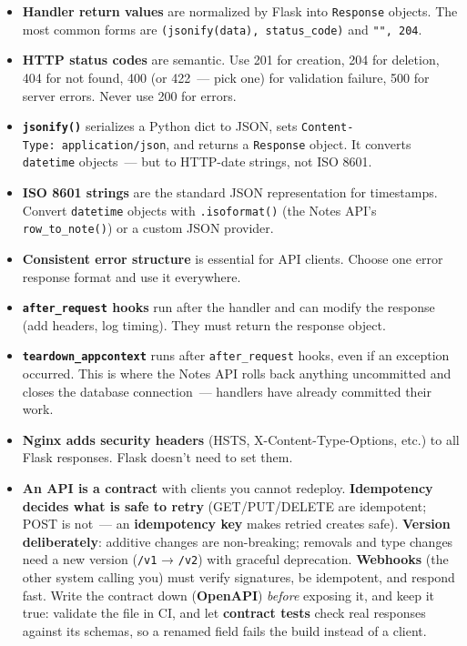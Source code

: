 \label{34-response-handling:key-takeaways}
\begin{takeaways}

\begin{itemize}
\tightlist
\item
  \textbf{Handler return values} are normalized by Flask into \texttt{Response} objects. The most common forms are \texttt{(jsonify(data),}\allowbreak{}\texttt{\ status\_}\allowbreak{}\texttt{code)} and \texttt{"",\ 204}.
\item
  \textbf{HTTP status codes} are semantic. Use 201 for creation, 204 for deletion, 404 for not found, 400 (or 422~--- pick one) for validation failure, 500 for server errors. Never use 200 for errors.
\item
  \textbf{\texttt{jsonify()}} serializes a Python dict to JSON, sets \texttt{Content-}\allowbreak{}\texttt{Type:}\allowbreak{}\texttt{\ application/}\allowbreak{}\texttt{json}, and returns a \texttt{Response} object. It converts \texttt{datetime} objects~--- but to HTTP-date strings, not ISO 8601.
\item
  \textbf{ISO 8601 strings} are the standard JSON representation for timestamps. Convert \texttt{datetime} objects with \texttt{.isoformat()} (the Notes API's \texttt{row\_to\_note()}) or a custom JSON provider.
\item
  \textbf{Consistent error structure} is essential for API clients. Choose one error response format and use it everywhere.
\item
  \textbf{\texttt{after\_request} hooks} run after the handler and can modify the response (add headers, log timing). They must return the response object.
\item
  \textbf{\texttt{teardown\_appcontext}} runs after \texttt{after\_request} hooks, even if an exception occurred. This is where the Notes API rolls back anything uncommitted and closes the database connection~--- handlers have already committed their work.
\item
  \textbf{Nginx adds security headers} (HSTS, X-Content-Type-Options, etc.) to all Flask responses. Flask doesn't need to set them.
\item
  \textbf{An API is a contract} with clients you cannot redeploy. \textbf{Idempotency decides what is safe to retry} (GET/PUT/DELETE are idempotent; POST is not~--- an \textbf{idempotency key} makes retried creates safe). \textbf{Version deliberately}: additive changes are non-breaking; removals and type changes need a new version (\texttt{/v1} → \texttt{/v2}) with graceful deprecation. \textbf{Webhooks} (the other system calling you) must verify signatures, be idempotent, and respond fast. Write the contract down (\textbf{OpenAPI}) \emph{before} exposing it, and keep it true: validate the file in CI, and let \textbf{contract tests} check real responses against its schemas, so a renamed field fails the build instead of a client.

\end{itemize}
\end{takeaways}
